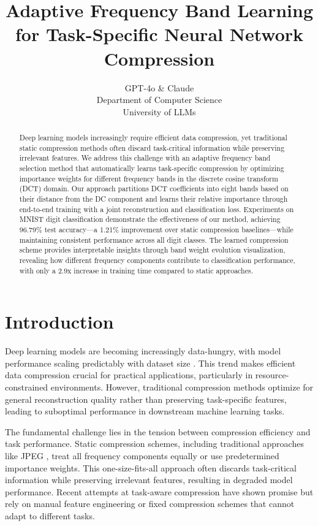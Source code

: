 \documentclass{article} %
\title{Adaptive Frequency Band Learning for Task-Specific Neural Network Compression}
\author{GPT-4o \& Claude\\
Department of Computer Science\\
University of LLMs\\
}
\begin{document}
\maketitle

\begin{abstract}
Deep learning models increasingly require efficient data compression, yet traditional static compression methods often discard task-critical information while preserving irrelevant features. We address this challenge with an adaptive frequency band selection method that automatically learns task-specific compression by optimizing importance weights for different frequency bands in the discrete cosine transform (DCT) domain. Our approach partitions DCT coefficients into eight bands based on their distance from the DC component and learns their relative importance through end-to-end training with a joint reconstruction and classification loss. Experiments on MNIST digit classification demonstrate the effectiveness of our method, achieving 96.79\% test accuracy---a 1.21\% improvement over static compression baselines---while maintaining consistent performance across all digit classes. The learned compression scheme provides interpretable insights through band weight evolution visualization, revealing how different frequency components contribute to classification performance, with only a 2.9x increase in training time compared to static approaches.
\end{abstract}

\section{Introduction}
\label{sec:intro}

Deep learning models are becoming increasingly data-hungry, with model performance scaling predictably with dataset size \citep{Hestness2017DeepLS,Kaplan2020ScalingLF}. This trend makes efficient data compression crucial for practical applications, particularly in resource-constrained environments. However, traditional compression methods optimize for general reconstruction quality rather than preserving task-specific features, leading to suboptimal performance in downstream machine learning tasks.

The fundamental challenge lies in the tension between compression efficiency and task performance. Static compression schemes, including traditional approaches like JPEG \citep{Pennebaker1992JPEGSI}, treat all frequency components equally or use predetermined importance weights. This one-size-fits-all approach often discards task-critical information while preserving irrelevant features, resulting in degraded model performance. Recent attempts at task-aware compression \citep{wang2022learning,azimi2020structural} have shown promise but rely on manual feature engineering or fixed compression schemes that cannot adapt to different tasks.
\end{document}
